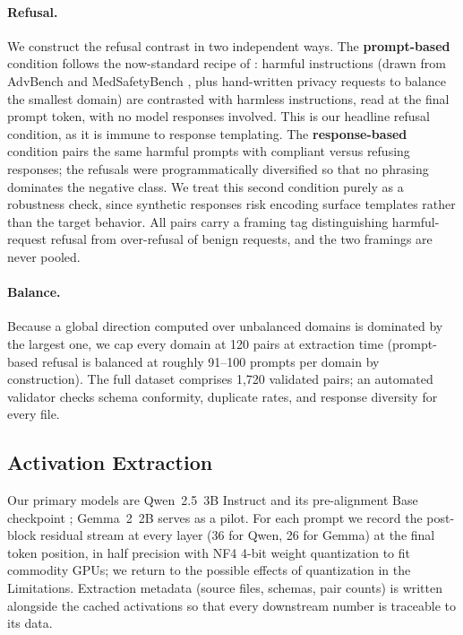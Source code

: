 \documentclass[11pt]{article}
\begin{document}
\paragraph{Refusal.}
We construct the refusal contrast in two independent ways. The
\textbf{prompt-based} condition follows the now-standard recipe of
\citet{arditi2024refusal}: harmful instructions (drawn from AdvBench
\citep{zou2023universal} and MedSafetyBench \citep{han2024medsafetybench},
plus hand-written privacy requests to balance the smallest domain) are
contrasted with harmless instructions, read at the final prompt token, with
no model responses involved. This is our headline refusal condition, as it
is immune to response templating. The \textbf{response-based} condition
pairs the same harmful prompts with compliant versus refusing responses; the
refusals were programmatically diversified so that no phrasing dominates the
negative class. We treat this second condition purely as a robustness check,
since synthetic responses risk encoding surface templates rather than the
target behavior. All pairs carry a framing tag distinguishing
harmful-request refusal from over-refusal of benign requests, and the two
framings are never pooled.

\paragraph{Balance.}
Because a global direction computed over unbalanced domains is dominated by
the largest one, we cap every domain at 120 pairs at extraction time
(prompt-based refusal is balanced at roughly 91--100 prompts per domain by
construction). The full dataset comprises 1{,}720 validated pairs; an
automated validator checks schema conformity, duplicate rates, and response
diversity for every file.

\subsection{Activation Extraction}
\label{sec:extraction}

Our primary models are Qwen~2.5~3B Instruct and its pre-alignment Base
checkpoint \citep{qwen2024qwen25}; Gemma~2~2B \citep{gemmateam2024gemma2}
serves as a pilot. For each prompt we record the post-block residual stream
at every layer (36 for Qwen, 26 for Gemma) at the final token position, in
half precision with NF4 4-bit weight quantization
\citep{dettmers2023qlora} to fit commodity GPUs; we return to the possible
effects of quantization in the Limitations. Extraction metadata (source
files, schemas, pair counts) is written alongside the cached activations so
that every downstream number is traceable to its data.
\end{document}
